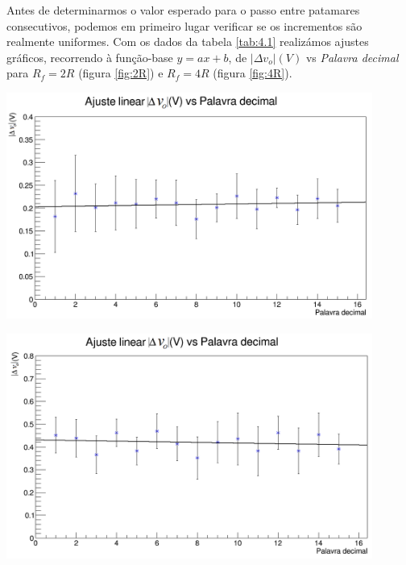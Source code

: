 \documentclass[a4paper,11pt]{report}
\begin{document}
\vspace{110pt}
Antes de determinarmos o valor esperado para o passo entre patamares consecutivos, podemos em primeiro lugar verificar se os incrementos são realmente uniformes.
Com os dados da tabela \ref{tab:4.1} realizámos ajustes gráficos, recorrendo à função-base $y=ax+b$, de $|\Delta v_o| (V)$ vs \textit{Palavra decimal} para $R_f=2R$ (figura \ref{fig:2R}) e $R_f=4R$ (figura \ref{fig:4R}).


\begin{center}
     \includegraphics[angle=0,width=0.9\textwidth]{2R.png}
     \label{fig:2R}
     \end{center}



     
\begin{center}
     \includegraphics[angle=0,width=0.9\textwidth]{4R.png}
     \label{fig:4R}
     \end{center}
\end{document}
